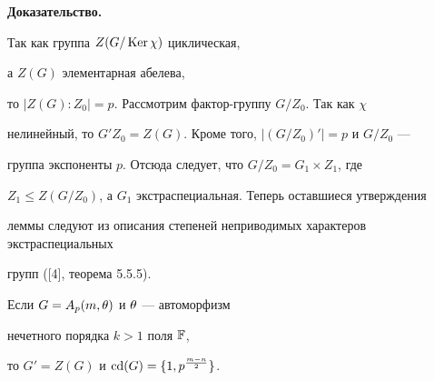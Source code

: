 {\bf Доказательство.}


Так как группа $Z(G/\operatorname{Ker}\chi)$ циклическая,


а $Z(G)$ элементарная абелева, 


то $|Z(G):Z_0|=p$. Рассмотрим фактор-группу $G/Z_0$. Так как $\chi$ 


нелинейный, то $G'Z_0=Z(G)$. Кроме того, $|(G/Z_0)'|=p$ и $G/Z_0$ ---


группа экспоненты $p$. Отсюда следует, что $G/Z_0=G_1\times Z_1$, где


$Z_1\le Z(G/Z_0)$, а $G_1$ экстраспециальная. Теперь оставшиеся утверждения 


леммы следуют из описания степеней неприводимых характеров экстраспециальных 


групп ([4], теорема 5.5.5). 








\begin{thm}


Если $G=A_p(m,\theta)$ и $\theta$ --- автоморфизм 


нечетного порядка $k>1$ поля $\Bbb F$,


то $G'=Z(G)$ и $\operatorname{cd}(G)=\lbrace1,p^{\frac{m-n}2}\rbrace$.


\end{thm}









